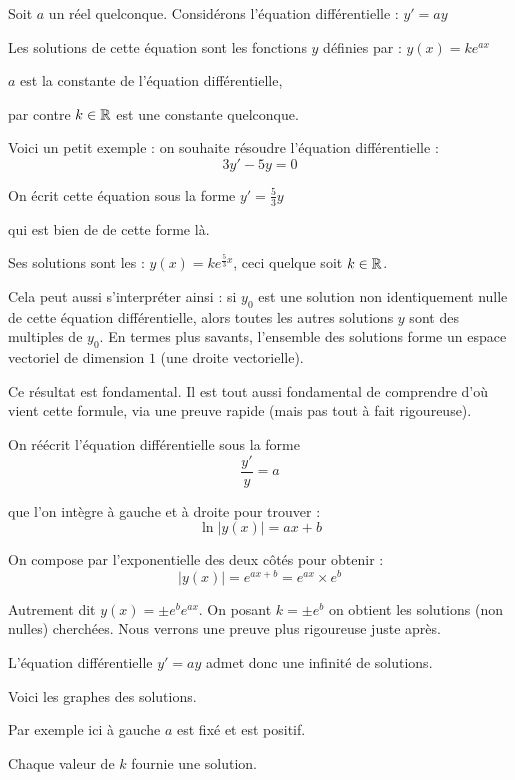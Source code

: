 Soit $a$ un réel quelconque. Considérons 
l'équation différentielle :
$y' = a y $ 

\change

Les solutions de cette équation sont les fonctions $y$ définies par :
$y(x) = k e^{ax}$

$a$ est la constante de l'équation différentielle,

\change
par contre $k\in \mathbb{R}$ est une constante quelconque.


\change
Voici un petit exemple :
on souhaite résoudre l'équation différentielle : 
$$3y' - 5y = 0$$

\change
On écrit cette équation sous la forme $y' = \frac53 y$

qui est bien de de cette forme là.

\change
Ses solutions sont les : $y(x) = k e^{\frac53x}$, ceci quelque soit
$k \in \mathbb{R}$.  

Cela peut aussi s'interpréter ainsi : 
si $y_0$ est une solution non identiquement nulle de
cette équation différentielle, 
alors toutes les autres solutions $y$ sont des multiples de $y_0$. 
En termes plus savants,
l'ensemble des solutions forme un espace vectoriel de dimension $1$ (une droite vectorielle).

\change

Ce résultat est fondamental. Il est tout aussi fondamental de 
comprendre d'où vient cette formule, via une preuve rapide 
(mais pas tout à fait rigoureuse). 

\change
On réécrit l'équation 
différentielle sous la forme
$$\frac{y'}{y} =  a$$

\change
que l'on intègre à gauche et à droite pour trouver :
$$\ln |y(x)| = ax+b$$

\change
On compose par l'exponentielle des deux côtés pour obtenir :
$$|y(x)| = e^{ax+b} = e^{ax}\times e^b$$

\change
Autrement dit  $y(x) = \pm e^b e^{ax}$.
On posant $k = \pm e^b$ on obtient les solutions 
(non nulles) cherchées.
Nous verrons une preuve plus rigoureuse juste après.



\diapo


L'équation différentielle $y'= a y$
admet donc une infinité de solutions.

Voici les graphes des solutions.

Par exemple ici à gauche $a$ est fixé et est positif.

Chaque valeur de $k$ fournie une solution.


